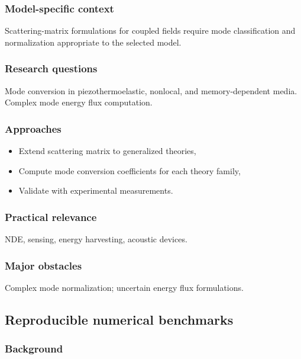 \subsubsection{Model-specific context}

Scattering-matrix formulations for coupled fields require mode classification and normalization appropriate to the selected model.

\subsubsection{Research questions}

Mode conversion in piezothermoelastic, nonlocal, and memory-dependent media. Complex mode energy flux computation.

\subsubsection{Approaches}

\begin{itemize}
\item Extend scattering matrix to generalized theories,
\item Compute mode conversion coefficients for each theory family,
\item Validate with experimental measurements.
\end{itemize}

\subsubsection{Practical relevance}

NDE, sensing, energy harvesting, acoustic devices.

\subsubsection{Major obstacles}

Complex mode normalization; uncertain energy flux formulations.

\subsection{Reproducible numerical benchmarks}
\label{sec:reproducible-benchmarks}

\subsubsection{Background}

